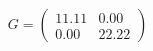 \documentclass[preview]{standalone}
\begin{document}
\begin{align*}
G = \begin{pmatrix} 11.11 & 0.00 \\ 0.00 & 22.22 \end{pmatrix}
\end{align*}
\end{document}

